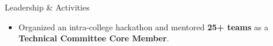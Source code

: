 \documentclass{resume}
\begin{document}
\begin{experienceSection}{Leadership \& Activities}

    \begin{itemize}
        \itemsep -6pt {}

        \item Organized an intra-college hackathon and mentored \textbf{25+ teams} as a \textbf{Technical Committee Core Member}.

    \end{itemize}

\end{experienceSection}
\end{document}
